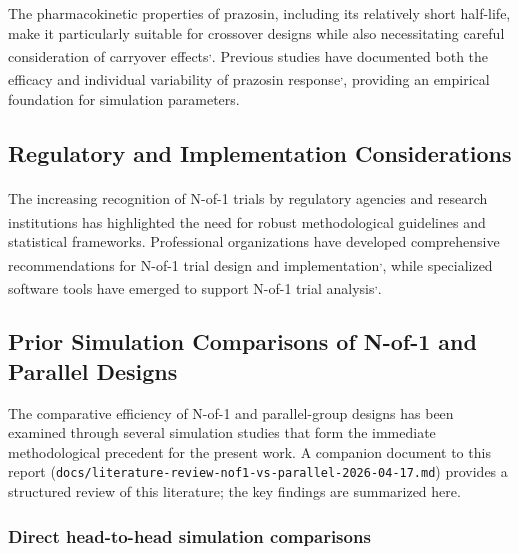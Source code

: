 \documentclass[
  11pt,
]{article}
\begin{document}
The pharmacokinetic properties of prazosin, including its relatively
short half-life, make it particularly suitable for crossover designs
while also necessitating careful consideration of carryover
effects\textsuperscript{,}.
Previous studies have documented both the efficacy and individual
variability of prazosin
response\textsuperscript{,},
providing an empirical foundation for simulation parameters.

\subsection{Regulatory and Implementation
Considerations}\label{regulatory-and-implementation-considerations}

The increasing recognition of N-of-1 trials by regulatory
agencies\textsuperscript{} and
research
institutions\textsuperscript{} has
highlighted the need for robust methodological guidelines and
statistical frameworks. Professional organizations have developed
comprehensive recommendations for N-of-1 trial design and
implementation\textsuperscript{,},
while specialized software tools have emerged to support N-of-1 trial
analysis\textsuperscript{,}.

\subsection{Prior Simulation Comparisons of N-of-1 and Parallel
Designs}\label{prior-simulation-comparisons-of-n-of-1-and-parallel-designs}

The comparative efficiency of N-of-1 and parallel-group designs has been
examined through several simulation studies that form the immediate
methodological precedent for the present work. A companion document to
this report
(\texttt{docs/literature-review-nof1-vs-parallel-2026-04-17.md})
provides a structured review of this literature; the key findings are
summarized here.

\subsubsection{Direct head-to-head simulation
comparisons}\label{direct-head-to-head-simulation-comparisons}
\end{document}
